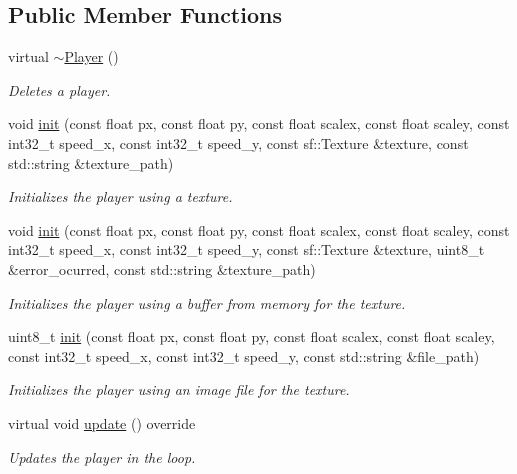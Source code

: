 \subsection*{Public Member Functions}
\begin{DoxyCompactItemize}
\item 
virtual \hyperlink{class_player_a8981c201ffb2270c0b6dbd467b627376}{$\sim$\+Player} ()
\begin{DoxyCompactList}\small\item\em Deletes a player. \end{DoxyCompactList}\item 
void \hyperlink{class_player_a233653ab275223ac155502c75ce3d6ae}{init} (const float px, const float py, const float scalex, const float scaley, const int32\+\_\+t speed\+\_\+x, const int32\+\_\+t speed\+\_\+y, const sf\+::\+Texture \&texture, const std\+::string \&texture\+\_\+path)
\begin{DoxyCompactList}\small\item\em Initializes the player using a texture. \end{DoxyCompactList}\item 
void \hyperlink{class_player_a1f8dfcbd703425cf023a70da50e3e509}{init} (const float px, const float py, const float scalex, const float scaley, const int32\+\_\+t speed\+\_\+x, const int32\+\_\+t speed\+\_\+y, const sf\+::\+Texture \&texture, uint8\+\_\+t \&error\+\_\+ocurred, const std\+::string \&texture\+\_\+path)
\begin{DoxyCompactList}\small\item\em Initializes the player using a buffer from memory for the texture. \end{DoxyCompactList}\item 
uint8\+\_\+t \hyperlink{class_player_aedca812017105fb33ad149973c24b80d}{init} (const float px, const float py, const float scalex, const float scaley, const int32\+\_\+t speed\+\_\+x, const int32\+\_\+t speed\+\_\+y, const std\+::string \&file\+\_\+path)
\begin{DoxyCompactList}\small\item\em Initializes the player using an image file for the texture. \end{DoxyCompactList}\item 
virtual void \hyperlink{class_player_abe7d0a24ffd93ba0bc4eea860b10eb09}{update} () override
\begin{DoxyCompactList}\small\item\em Updates the player in the loop. \end{DoxyCompactList}\end{DoxyCompactItemize}
